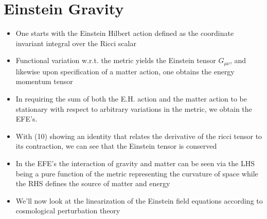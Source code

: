 \documentclass[10pt,letterpaper]{article}
\numberwithin{equation}{section}
\begin{document}

\section{Einstein Gravity}
\begin{itemize}
	\item One starts with the Einstein Hilbert action defined as the coordinate invariant integral over the Ricci scalar
	\item Functional variation w.r.t. the metric yields the Einstein tensor $G_{\mu\nu}$, and likewise upon specification of a matter action, one obtains the energy momentum tensor
	\item In requiring the sum of both the E.H. action and the matter action to be stationary with respect to arbitrary variations in the metric, we obtain the EFE's.
	\item With (10) showing an identity that relates the derivative of the ricci tensor to its contraction, we can see that the Einstein tensor is conserved
	\item In the EFE's the interaction of gravity and matter can be seen via the LHS being a pure function of the metric representing the curvature of space while the RHS defines the source of matter and energy
	\item We'll now look at the linearization of the Einstein field equations according to cosmological perturbation theory
\end{itemize}

\end{document}
